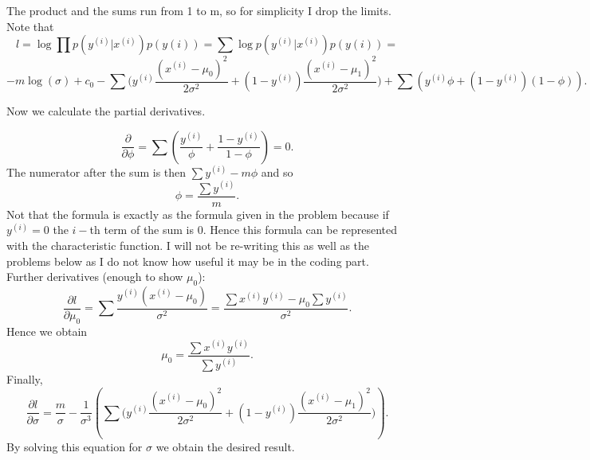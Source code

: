 \begin{answer}
The product and the sums run from  1 to m, so for simplicity I drop the limits. Note that
$$l = \log\prod p(y^{(i)}| x^{(i)})p(y{(i)}) = \sum\log p(y^{(i)}| x^{(i)})p(y{(i)}) = $$$$
 -m\log(\sigma) + c_0 - \sum\big( y^{(i)}\frac{(x^{(i)} - \mu_0)^2}{2\sigma^2} + (1- y^{(i)})\frac{(x^{(i)} - \mu_1)^2}{2\sigma^2}\big) + \sum(y^{(i)}\phi + (1-y^{(i)})(1-\phi)).$$
 
 Now we calculate the partial derivatives.
 
 $$\frac{\partial}{\partial\phi} = \sum(\frac{y^{(i)}}{\phi} + \frac{1- y^{(i)}}{1-\phi}) = 0.$$
 The numerator after the sum is then $\sum y^{(i)} - m\phi$ and so
 $$\phi= \frac{\sum y^{(i)}}{m}.$$
 Not that the formula is exactly as the formula given in the problem because if $y^{(i)} = 0$ the $i-$th term of the sum is $0.$ Hence this formula can be represented with the characteristic function. I will not be re-writing this as well as the problems below as I do not know how useful it may be in the coding part.
 Further derivatives (enough to show $\mu_0$):
 $$\frac{\partial l}{\partial\mu_0} =\sum\frac{y^{(i)}(x^{(i)} - \mu_0 )}{\sigma^2} = \frac{\sum x^{(i)}y^{(i)} - \mu_0\sum y^{(i)}}{\sigma^2}.$$
 Hence we obtain
 $$\mu_0 = \frac{\sum x^{(i)}y^{(i)}}{\sum y^{(i)}}.$$
 Finally, 
 $$\frac{\partial l}{\partial \sigma} = \frac{m}{\sigma} - \frac{1}{\sigma^3}(\sum\big( y^{(i)}\frac{(x^{(i)} - \mu_0)^2}{2\sigma^2} + (1- y^{(i)})\frac{(x^{(i)} - \mu_1)^2}{2\sigma^2}\big)).$$
 By solving this equation for $\sigma$ we obtain the desired result.
 
 
 
\end{answer}
